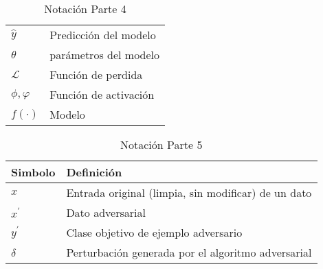 \begin{table}[H]
\begin{center}
\begin{tabularx}{\textwidth}{|l|X|}
            $ \hat{y} $                                & Predicción del modelo                                                                                                                                                          \\
            $ \theta $                                 & parámetros del modelo                                                                                                                                                          \\
            $ \mathcal{L} $                            & Función de perdida                                                                                                                                                             \\
            $ \phi ,\varphi $                          & Función de activación                                                                                                                                                          \\
            $ f\left(\cdot\right) $                    & Modelo                                                                                                                                                                         \\

            \hline
        \end{tabularx}
        \caption{Notación Parte 4}
        \label{tab:nnotation-part-4}
    \end{center}
\end{table}

\begin{table}[H]
    \begin{center}
        \begin{tabularx}{\textwidth}{|l|X|}
            \hline
            \textbf{Simbolo} & \textbf{Definición}                                 \\
            \hline %
            $ x $            & Entrada original (limpia, sin modificar) de un dato \\
            $ x^{\prime} $   & Dato adversarial                                    \\
            $ y^{\prime} $   & Clase objetivo de ejemplo adversario                \\
            $ \delta $       & Perturbación generada por el algoritmo adversarial  \\
            \hline
        \end{tabularx}
        \caption{Notación Parte 5}
        \label{tab:nnotation-part-5}
    \end{center}
\end{table}




